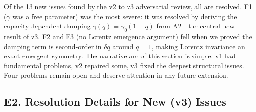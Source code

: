 \documentclass[reprint]{revtex4-2}
\begin{document}
Of the 13 new issues found by the v2 to v3 adversarial review, all are resolved. F1 ($\gamma$ was a free parameter) was the most severe: it was resolved by deriving the capacity-dependent damping $\gamma(q)=\gamma_0(1-q)$ from A2---the central new result of v3. F2 and F3 (no Lorentz emergence argument) fell when we proved the damping term is second-order in $\delta q$ around $q=1$, making Lorentz invariance an exact emergent symmetry. The narrative arc of this section is simple: v1 had fundamental problems, v2 repaired some, v3 fixed the deepest structural issues. Four problems remain open and deserve attention in any future extension.

\subsection{E2. Resolution Details for New (v3) Issues}
\end{document}
